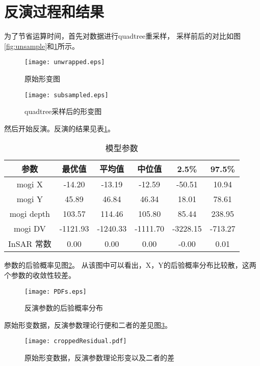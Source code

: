 \section{反演过程和结果}
为了节省运算时间，首先对数据进行quadtree重采样，
采样前后的对比如图\ref{fig:unsample}和\ref{fig:subsample}所示。
\begin{figure}[htp]
    \centering
    \begin{minipage}{0.9\textwidth}
        \centering
        \texttt{[image: unwrapped.eps]}
        \caption{原始形变图}
        \label{fig:unsample}
    \end{minipage}
    \qquad
    \begin{minipage}{0.9\textwidth}
        \centering
        \texttt{[image: subsampled.eps]}
        \caption{quadtree采样后的形变图}
        \label{fig:subsample}
    \end{minipage}
\end{figure}
然后开始反演。反演的结果见表\ref{tab:modelpar}。
\begin{table}[htb]
    \centering\small
    \caption{模型参数}
    \label{tab:modelpar}
    \begin{tabular}{@{}cccccc@{}}
    \toprule
    参数       & 最优值 & 平均值 & 中位值 & 2.5\% & 97.5\% \\ 
    \midrule
    mogi X    & -14.20 & -13.19 &-12.59 & -50.51 & 10.94 \\
    mogi Y     & 45.89 & 46.84 & 46.34 & 18.01 & 78.61\\
    mogi depth & 103.57 & 114.46 & 105.80 & 85.44 & 238.95\\
    mogi DV   & -1121.93 & -1240.33 & -1111.70 & -3228.15 & -713.27\\
    InSAR 常数 & 0.00 & 0.00 & 0.00 & -0.00 & 0.01\\
    \bottomrule
    \end{tabular}
\end{table}
参数的后验概率见图\ref{fig:pdf}。
从该图中可以看出，X，Y的后验概率分布比较散，这两个参数的收敛性较差。
\begin{figure}[htb]
    \centering
    \texttt{[image: PDFs.eps]}
    \caption{反演参数的后验概率分布}
    \label{fig:pdf}
\end{figure}
原始形变数据，反演参数理论行便和二者的差见图\ref{fig:residual}。
\begin{figure}[htb]
    \centering
    \texttt{[image: croppedResidual.pdf]}
    \caption{原始形变数据，反演参数理论形变以及二者的差}
    \label{fig:residual}
\end{figure}

